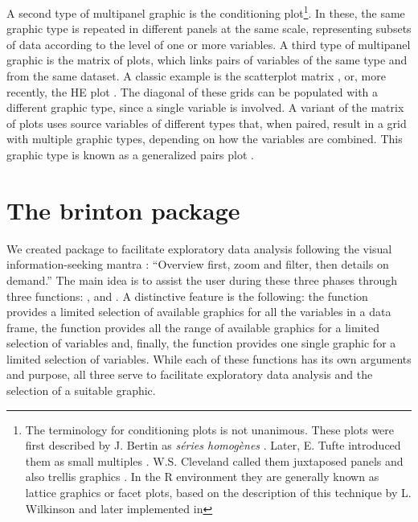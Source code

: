 A second type of multipanel graphic is the conditioning plot\footnote{The
	terminology for conditioning plots is not unanimous. These plots were
	first described by J. Bertin as \emph{séries homogènes}
	\citep[p.26]{Bertin1967}. Later, E. Tufte introduced them as small
	multiples \citep{Tufte1983}. W.S. Cleveland called them juxtaposed
	panels \citep[p.200]{Cleveland1985} and also trellis graphics
	\citep{Becker1996}. In the R environment they are generally
	known as lattice graphics \citep{Sarkar2008} or facet plots, based on
	the description of this technique by L. Wilkinson
	\citeyearpar{Wilkinson2005} and later implemented in }.
In these, the same graphic type is repeated in different panels at the
same scale, representing subsets of data according to the level of one
or more variables. A third type of multipanel graphic is the matrix of
plots, which links pairs of variables of the same type and from the same
dataset. A classic example is the scatterplot matrix
\citep{Hartigan1975}, or, more recently, the HE plot
\citep{Friendly2007}. The diagonal of these grids can be populated with
a different graphic type, since a single variable is involved. A variant
of the matrix of plots uses source variables of different types that,
when paired, result in a grid with multiple graphic types, depending on
how the variables are combined. This graphic type is known as a
generalized pairs plot \citep{Emerson2013}.

\hypertarget{the-brinton-package}{%
	\section{The brinton package}\label{the-brinton-package}}

We created  package to facilitate exploratory data analysis
following the visual information-seeking mantra \citep{Shneiderman1996}:
``Overview first, zoom and filter, then details on demand.'' The main
idea is to assist the user during these three phases through three
functions: ,  and . 
A distinctive feature is the following: the  function 
provides a limited selection of available graphics for all the variables 
in a data frame, the  function provides all the range of 
available graphics for a limited selection of variables and, finally, the 
 function provides one single graphic for a limited selection 
of variables. While each of these functions has its own arguments and purpose, 
all three serve to facilitate exploratory data analysis and the selection of
a suitable graphic.

